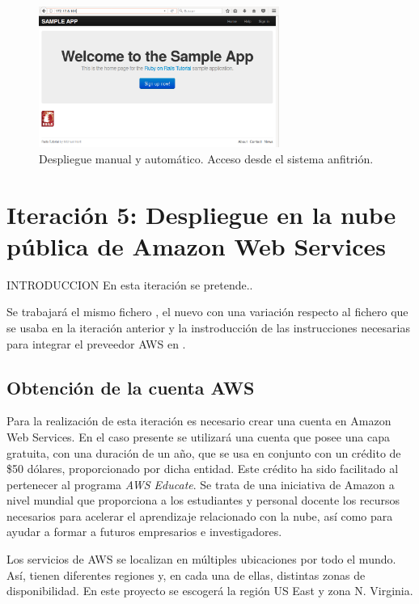 \begin{figure}[H]
\centering
\includegraphics[width=0.7\textwidth]{images/figures/coreosmanualhost.png}
\caption{Despliegue manual y automático. Acceso desde el sistema anfitrión.\label{fig:figure_placement_example}}
\end{figure}

\section{Iteración 5: Despliegue en la nube pública de Amazon Web Services}

INTRODUCCION En esta iteración se pretende..

Se trabajará el mismo fichero , el nuevo  con una variación respecto al fichero  que se usaba en la iteración anterior y la instroducción de las instrucciones necesarias para integrar el preveedor AWS en .

\subsection{Obtención de la cuenta AWS}

Para la realización de esta iteración es necesario crear una cuenta en Amazon Web Services. En el caso presente se utilizará una cuenta que posee una capa gratuita, con una duración de un año, que se usa en conjunto con un crédito de \$50 dólares, proporcionado por dicha entidad. Este crédito ha sido facilitado al pertenecer al programa \textit{AWS Educate}. Se trata de una iniciativa de Amazon a nivel mundial que proporciona a los estudiantes y personal docente los recursos necesarios para acelerar el aprendizaje relacionado con la nube, así como para ayudar a formar a futuros empresarios e investigadores.

Los servicios de AWS se localizan en múltiples ubicaciones por todo el mundo. Así, tienen diferentes regiones y, en cada una de ellas, distintas zonas de disponibilidad. En este proyecto se escogerá la región US East y zona N. Virginia.

